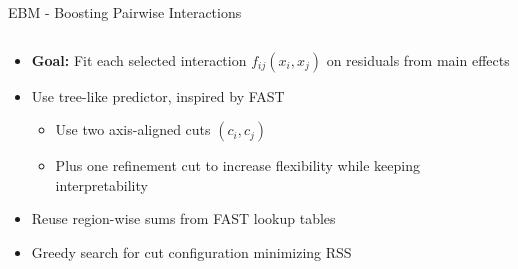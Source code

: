 \documentclass[10pt,compress,t,notes=noshow, xcolor=table]{beamer}
\begin{document}
\begin{frame}{EBM - Boosting Pairwise Interactions}
\begin{columns}[c, totalwidth=\textwidth]
    \begin{column}{0.67\textwidth}
        \begin{itemize}
            \item \textbf{Goal:} Fit each selected interaction $f_{ij}(x_i, x_j)$ on residuals from main effects
            \item Use tree-like predictor, inspired by FAST
            \begin{itemize}
                \item Use two axis-aligned cuts $(c_i, c_j)$ 
                \item Plus one refinement cut to increase flexibility while keeping interpretability
            \end{itemize}
            \item Reuse region-wise sums from FAST lookup tables
            \item Greedy search for cut configuration minimizing RSS
        \end{itemize}
    \end{column}
\end{columns}
\end{frame}



\end{document}
